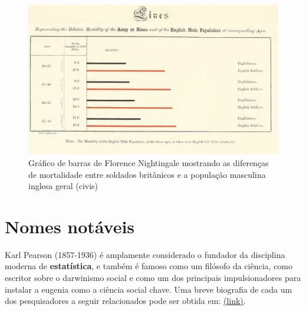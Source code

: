 \documentclass[
]{book}
\begin{document}
\begin{figure}

{\centering \includegraphics[width=0.75\linewidth]{images1/florence-barr} 

}

\caption{Gráfico de barras de Florence Nightingale mostrando as diferenças de mortalidade entre soldados britânicos e a população masculina inglesa geral (civis)}\label{fig:unnamed-chunk-15}
\end{figure}

\hfill\break

\hypertarget{nomes-notuxe1veis}{%
\section{Nomes notáveis}\label{nomes-notuxe1veis}}

Karl Pearson (1857-1936) é amplamente considerado o fundador da disciplina moderna de \textbf{estatística}, e também é famoso como um filósofo da ciência, como escritor sobre o darwinismo social e como um dos principais impulsionadores para instalar a eugenia como a ciência social chave. Uma breve biografia de cada um dos pesquisadores a seguir relacionados pode ser obtida em: \href{http://www-history.mcs.st-andrews.ac.uk/BiogIndex.html}{(link)}.
\end{document}
